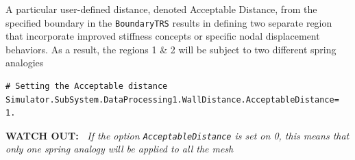 \documentclass[11pt]{article}
\begin{document}
A particular user-defined distance, denoted Acceptable Distance, from the specified boundary in the {\tt BoundaryTRS} results in defining two separate region that incorporate improved stiffness concepts or specific nodal displacement behaviors. As a result, the regions 1 \& 2 will be subject to two different spring analogies

\begin{lstlisting}[breaklines]
# Setting the Acceptable distance 
Simulator.SubSystem.DataProcessing1.WallDistance.AcceptableDistance= 1.
\end{lstlisting}

\begin{figure}[H]
\end{figure}
{\bf WATCH OUT:~} {\it If the option {\tt AcceptableDistance} is set on 0, this means that only one spring analogy will be applied to all the mesh}
\end{document}
